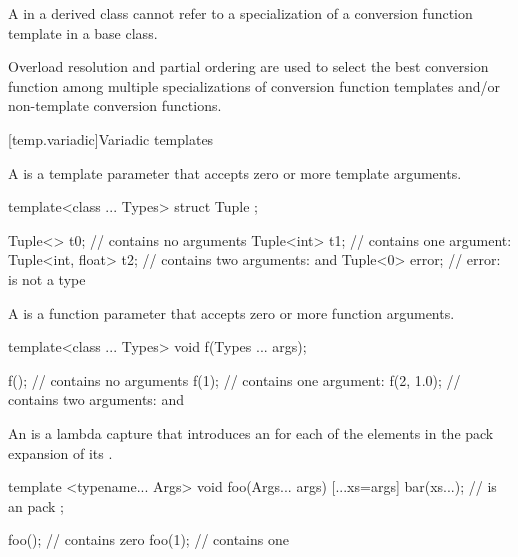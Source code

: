 \pnum
A  in a derived class cannot refer to a specialization
of a
conversion function template
in a base class.

\pnum
Overload resolution and partial
ordering are used to select the best conversion function
among multiple
specializations of conversion function templates
and/or non-template
conversion functions.

[temp.variadic]{Variadic templates}

\pnum
A  is a template parameter
that accepts zero or more template arguments.
\begin{example}

\begin{codeblock}
template<class ... Types> struct Tuple { };

Tuple<> t0;                     //  contains no arguments
Tuple<int> t1;                  //  contains one argument: 
Tuple<int, float> t2;           //  contains two arguments:  and 
Tuple<0> error;                 // error:  is not a type
\end{codeblock}
\end{example}

\pnum
A  is a function parameter
that accepts zero or more function arguments.
\begin{example}

\begin{codeblock}
template<class ... Types> void f(Types ... args);

f();                            //  contains no arguments
f(1);                           //  contains one argument: 
f(2, 1.0);                      //  contains two arguments:  and 
\end{codeblock}
\end{example}

\pnum
An 
is a lambda capture that introduces an 
for each of the elements in the pack expansion of its .
\begin{example}
\begin{codeblock}
template <typename... Args>
void foo(Args... args) {
    [...xs=args]{
        bar(xs...);             //  is an  pack
    };
}

foo();                          //  contains zero 
foo(1);                         //  contains one 
\end{codeblock}
\end{example}

